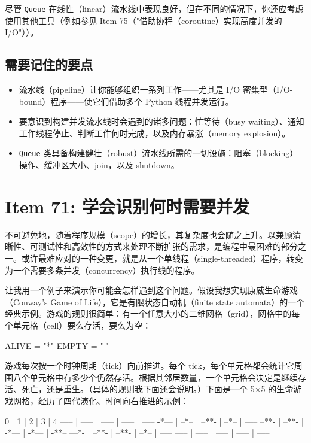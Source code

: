 尽管 \texttt{Queue} 在线性（linear）流水线中表现良好，但在不同的情况下，你还应考虑使用其他工具（例如参见 Item 75（"借助协程（coroutine）实现高度并发的 I/O"））。

\subsection{需要记住的要点}

\begin{itemize}
\item 流水线（pipeline）让你能够组织一系列工作——尤其是 I/O 密集型（I/O-bound）程序——使它们借助多个 Python 线程并发运行。
\item 要意识到构建并发流水线时会遇到的诸多问题：忙等待（busy waiting）、通知工作线程停止、判断工作何时完成，以及内存暴涨（memory explosion）。
\item \texttt{Queue} 类具备构建健壮（robust）流水线所需的一切设施：阻塞（blocking）操作、缓冲区大小、join，以及 shutdown。
\end{itemize}

\section{Item 71: 学会识别何时需要并发}

不可避免地，随着程序规模（scope）的增长，其复杂度也会随之上升。以兼顾清晰性、可测试性和高效性的方式来处理不断扩张的需求，是编程中最困难的部分之一。或许最难应对的一种变更，就是从一个单线程（single-threaded）程序，转变为一个需要多条并发（concurrency）执行线的程序。

让我用一个例子来演示你可能会怎样遇到这个问题。假设我想实现康威生命游戏（Conway's Game of Life），它是有限状态自动机（finite state automata）的一个经典示例。游戏的规则很简单：有一个任意大小的二维网格（grid），网格中的每个单元格（cell）要么存活，要么为空：

\begin{codebox}[python]
ALIVE = "*"
EMPTY = "-"
\end{codebox}

游戏每次按一个时钟周期（tick）向前推进。每个 tick，每个单元格都会统计它周围八个单元格中有多少个仍然存活。根据其邻居数量，一个单元格会决定是继续存活、死亡，还是重生。（具体的规则我下面还会说明。）下面是一个 5×5 的生命游戏网格，经历了四代演化、时间向右推进的示例：

\begin{codebox}[python]
  0   |   1   |   2   |   3   |   4
----- | ----- | ----- | ----- | -----
-*--- | --*-- | --**- | --*-- | -----
--**- | --**- | -*--- | -*--- | -**--
---*- | --**- | --**- | --*-- | -----
----- | ----- | ----- | ----- | -----
\end{codebox}

